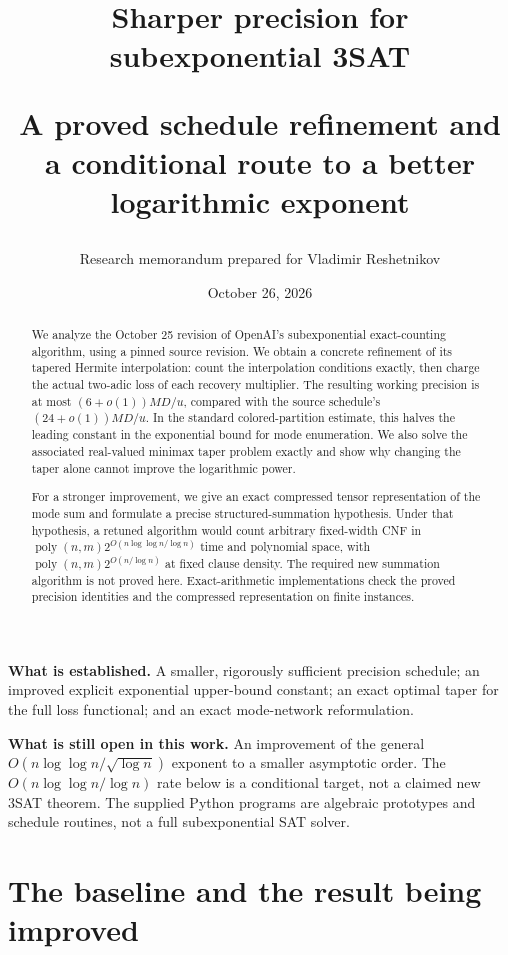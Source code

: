 \documentclass[11pt,letterpaper]{article}
\title{\color{navy}\bfseries Sharper precision for subexponential 3SAT\par
 \large A proved schedule refinement and a conditional route to a better logarithmic exponent}
\author{Research memorandum prepared for Vladimir Reshetnikov}
\date{October 26, 2026}
\numberwithin{equation}{section}
\theoremstyle{definition}
\theoremstyle{remark}
\newcommand{\poly}{\operatorname{poly}}
\begin{document}
\maketitle
\begin{abstract}
We analyze the October 25 revision of OpenAI's subexponential exact-counting
algorithm, using a pinned source revision. We obtain a concrete refinement of
its tapered Hermite interpolation: count the interpolation conditions exactly,
then charge the actual two-adic loss of each recovery multiplier. The resulting
working precision is at most $(6+o(1))MD/u$, compared with the source schedule's
$(24+o(1))MD/u$. In the standard colored-partition estimate, this halves the
leading constant in the exponential bound for mode enumeration. We also solve
the associated real-valued minimax taper problem exactly and show why changing
the taper alone cannot improve the logarithmic power.

For a stronger improvement, we give an exact compressed tensor representation
of the mode sum and formulate a precise structured-summation hypothesis.
Under that hypothesis, a retuned algorithm would count arbitrary fixed-width
CNF in $\poly(n,m)2^{O(n\log\log n/\log n)}$ time and polynomial space, with
$\poly(n,m)2^{O(n/\log n)}$ at fixed clause density. The required new summation
algorithm is not proved here. Exact-arithmetic implementations check the
proved precision identities and the compressed representation on finite
instances.
\end{abstract}

\begin{statusbox}
\textbf{What is established.} A smaller, rigorously sufficient precision
schedule; an improved explicit exponential upper-bound constant; an exact
optimal taper for the full loss functional; and an exact mode-network
reformulation.

\medskip
\textbf{What is still open in this work.} An improvement of the general
$O(n\log\log n/\sqrt{\log n})$ exponent to a smaller asymptotic order. The
$O(n\log\log n/\log n)$ rate below is a conditional target, not a claimed
new 3SAT theorem. The supplied Python programs are algebraic prototypes and
schedule routines, not a full subexponential SAT solver.
\end{statusbox}
\clearpage
\tableofcontents
\clearpage

\section{The baseline and the result being improved}
\label{sec:baseline}
\end{document}
